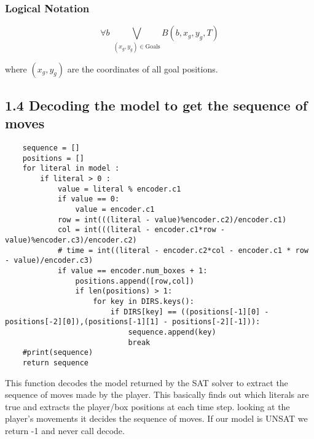 \documentclass[12pt,a4paper]{article}
\begin{document}
\subsubsection*{Logical Notation}

\[
\forall b \; \bigvee_{(x_g, y_g) \in \text{Goals}} B(b, x_g, y_g, T)
\]

where \((x_g, y_g)\) are the coordinates of all goal positions.
\newpage
\subsection*{1.4 Decoding the model to get the sequence of moves}
\begin{lstlisting}
    sequence = []
    positions = []
    for literal in model :
        if literal > 0 : 
            value = literal % encoder.c1
            if value == 0:
                value = encoder.c1
            row = int(((literal - value)%encoder.c2)/encoder.c1)
            col = int(((literal - encoder.c1*row - value)%encoder.c3)/encoder.c2)
            # time = int((literal - encoder.c2*col - encoder.c1 * row - value)/encoder.c3)
            if value == encoder.num_boxes + 1:
                positions.append([row,col])
                if len(positions) > 1:
                    for key in DIRS.keys():
                        if DIRS[key] == ((positions[-1][0] - positions[-2][0]),(positions[-1][1] - positions[-2][-1])):
                            sequence.append(key)
                            break
    #print(sequence)
    return sequence
\end{lstlisting}
This function decodes the model returned by the SAT solver to extract the sequence of moves made by the player.
This basically finds out which literals are true and extracts the player/box positions at each time step. looking at the player's movements it decides the sequence of moves. If our model is UNSAT we return -1 and never call decode.
\end{document}
